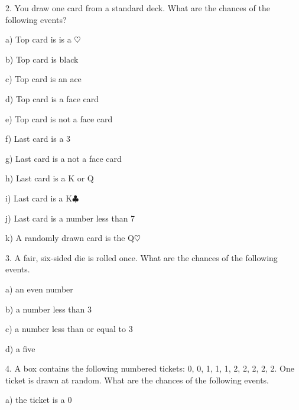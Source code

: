 \documentclass[10pt]{article}
\begin{document}
2.  You draw one card from a standard deck.  What are the
chances of the following events?

\hspace{10pt} a) Top card is is a $\heartsuit$
\bigskip

\hspace{10pt} b) Top card is black
\bigskip

\hspace{10pt} c) Top card is an ace
\bigskip

\hspace{10pt} d) Top card is a face card
\bigskip

\hspace{10pt} e) Top card is not a face card
\bigskip

\hspace{10pt} f) Last card is a 3
\bigskip

\hspace{10pt} g) Last card is a not a face card
\bigskip

\hspace{10pt} h)  Last card is a K or Q
\bigskip

\hspace{10pt} i) Last card is a K$\clubsuit$
\bigskip

\hspace{10pt} j) Last card is a number less than 7
\bigskip

\hspace{10pt} k) A randomly drawn card is the Q$\heartsuit$


\vfill
\eject


3. A fair, six-sided die is rolled once.  What are the chances of
the following events.

\hspace{10pt} a) an even number
\bigskip

\hspace{10pt} b) a number less than 3
\bigskip

\hspace{10pt} c) a number less than or equal to 3
\bigskip

\hspace{10pt} d) a five
\bigskip
\medskip

4. A box contains the following numbered tickets:  0, 0, 1, 1, 1, 2, 2, 2, 2, 2.  
One ticket is drawn at random.  What are the chances of
the following events.

\hspace{10pt} a) the ticket is a 0
\bigskip
\end{document}
